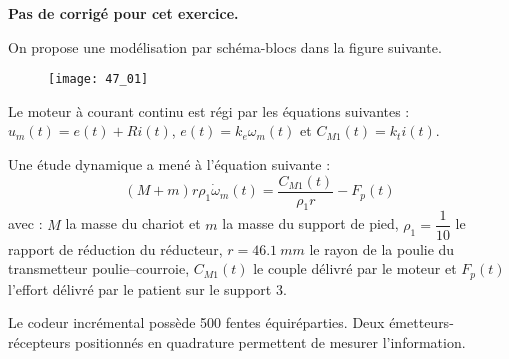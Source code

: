 \normaltrue \difficilefalse \tdifficilefalse
\correctiontrue

\setcounter{question}{0}
\ifcorrection
\else
\textbf{Pas de corrigé pour cet exercice.}
\fi



\ifprof
\else
On propose une modélisation par schéma-blocs dans la figure suivante. 
\begin{figure}[H]
\centering
{\texttt{[image: 47\_01]}}
\end{figure}




Le moteur à courant continu est régi par les équations suivantes :
$ u_m(t)=e(t)+Ri(t)$, $e(t)=k_e\omega_m(t)$ et $C_{M1}(t)=k_t i(t)$. 

Une étude dynamique a mené à l'équation suivante : 
$$\left(M+m\right)r\rho_1 \dot{\omega}_m(t)=\dfrac{C_{M1}(t)}{\rho_1 r}-F_p(t)$$ avec : $M$ la masse du chariot et $m$ la masse du support de pied, $\rho_1=\dfrac{1}{10}$ le rapport de réduction du réducteur, $r=\SI{46,1}{mm}$ le rayon de la poulie du transmetteur poulie--courroie, $C_{M1}(t)$ le couple délivré par le moteur et $F_p(t)$ l'effort délivré par le patient sur le support 3. 

Le codeur incrémental possède 500 fentes équiréparties. Deux émetteurs-récepteurs positionnés en quadrature permettent de mesurer l'information. 
\fi

